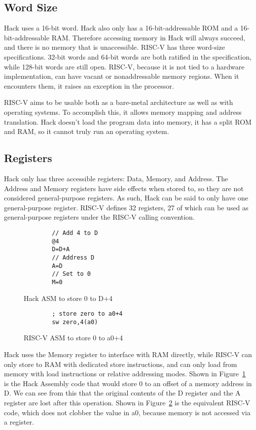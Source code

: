 \subsection{Word Size}

Hack uses a 16-bit word. Hack also only has a 16-bit-addressable ROM and a
16-bit-addressable RAM. Therefore accessing memory in Hack will always
succeed, and there is no memory that is unaccessible. RISC-V has three
word-size specifications. 32-bit words and 64-bit words are both ratified in
the specification, while 128-bit words are still open. RISC-V, because it is
not tied to a hardware implementation, can have vacant or nonaddressable memory
regions. When it encounters them, it raises an exception in the processor.

RISC-V aims to be usable both as a bare-metal architecture as well as with
operating systems. To accomplish this, it allows memory mapping and address
translation. Hack doesn't load the program data into memory, it has a split ROM
and RAM, so it cannot truly run an operating system.

\subsection{Registers}

Hack only has three accessible registers: Data, Memory, and Address. The
Address and Memory registers have side effects when stored to, so they are not
considered general-purpose registers. As such, Hack can be said to only have
one general-purpose register. RISC-V defines 32 registers, 27 of which can be
used as general-purpose registers under the RISC-V calling convention.

\begin{figure}
    \begin{verbatim}
        // Add 4 to D
        @4
        D=D+A
        // Address D
        A=D
        // Set to 0
        M=0
    \end{verbatim}
    \caption{Hack ASM to store 0 to D+4}
    \label{hack-store}
\end{figure}

\begin{figure}
    \begin{verbatim}
        ; store zero to a0+4
        sw zero,4(a0)
    \end{verbatim}
    \caption{RISC-V ASM to store 0 to a0+4}
    \label{riscv-store}
\end{figure}

Hack uses the Memory register to interface with RAM directly, while RISC-V can
only store to RAM with dedicated store instructions, and can only load from
memory with load instructions or relative addressing modes. Shown in
Figure~\ref{hack-store} is the Hack Assembly code that would store 0 to an
offset of a memory address in D. We can see from this that the original
contents of the D register and the A register are lost after this operation.
Shown in Figure~\ref{riscv-store} is the equivalent RISC-V code, which does not
clobber the value in a0, because memory is not accessed via a register.

